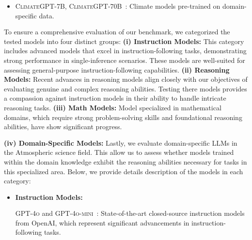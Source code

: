 \begin{itemize}[topsep=5pt, leftmargin=1em]
\vspace{-0.5em}
\item \textsc{ClimateGPT-7B}, \textsc{ClimateGPT-70B}~\cite{thulke2024climategpt}: Climate models pre-trained on domain-specific data.
\vspace{-0.5em}
\end{itemize}












\iffalse
{
To ensure a comprehensive evaluation of our benchmark, we categorized the tested models into four distinct groups: \textbf{(i) Instruction Models:} This category includes advanced models that excel in instruction-following tasks, demonstrating strong performance in single-inference scenarios. These models are well-suited for assessing general-purpose instruction-following capabilities. \textbf{(ii) Reasoning Models:} Recent advances in reasoning models align closely with our objectives of evaluating genuine and complex reasoning abilities. Testing there models provides a compassion against instruction models in their ability to handle intricate reasoning tasks. \textbf{(iii) Math Models:} Model specialized in mathematical domains, which require strong problem-solving skills and foundational reasoning abilities, have show significant progress. 


\textbf{(iv) Domain-Specific Models:} Lastly, we evaluate domain-specific LLMs in the Atmospheric science field. This allow us to assess whether models trained within the domain knowledge exhibit the reasoning abilities necessary for tasks in this specialized area. Below, we provide details description of the models in each category:
\begin{itemize}[topsep=5pt, leftmargin=1em]
    \item \textbf{Instruction Models:}
    
     \textsc{GPT-4o} and \textsc{GPT-4o-mini}~\cite{gpt4o}: State-of-the-art closed-source instruction models from OpenAI, which represent significant advancements in instruction-following tasks. 
     

\end{itemize}}
